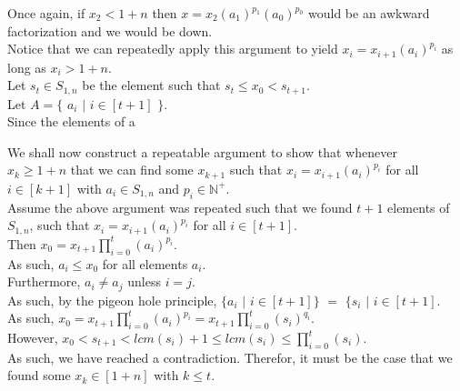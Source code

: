 \documentclass[a4paper,12pt]{article}
\begin{document}
\noindent Once again, if $x_2 < 1 + n$ then $x = x_2(a_1)^{p_1}(a_0)^{p_0}$ would be an awkward factorization and we would be down.\\

\noindent Notice that we can repeatedly apply this argument to yield $x_i = x_{i + 1}(a_i)^{p_i}$ as long as $x_i > 1 + n$.\\

\noindent Let $s_t \in S_{1, n}$ be the element such that $s_t \leq x_0 < s_{t + 1}$.\\

\noindent Let $A = \{$ $a_i$ $|$ $i \in [t + 1]$ $\}$.\\

\noindent Since the elements of a



\noindent We shall now construct a repeatable argument to show that whenever\\ $x_k \geq 1 + n$ that we can find some $x_{k + 1}$ such that $x_i = x_{i + 1}(a_i)^{p_i}$ for all $i \in [k + 1]$ with $a_i \in S_{1, n}$ and $p_i \in \mathbb{N}^+$.\\



\noindent Assume the above argument was repeated such that we found $t + 1$ elements of $S_{1, n}$, such that $x_i = x_{i+1}(a_i)^{p_i}$ for all $i \in [t + 1]$.\\

\noindent Then $\displaystyle x_0 = x_{t + 1} \prod_{i = 0}^t (a_i)^{p_i}$.\\

\noindent As such, $a_i \leq x_0$ for all elements $a_i$.\\

\noindent Furthermore, $a_i \neq a_j$ unless $i = j$.\\

\noindent As such, by the pigeon hole principle, $\{ a_i$ $|$ $i \in [t + 1] \}$ $=$ $\{ s_i$ $|$ $i \in [t + 1]$.\\

\noindent As such, $\displaystyle x_0 = x_{t + 1} \prod_{i = 0}^t (a_i)^{p_i} = x_{t + 1} \prod_{i = 0}^t (s_i)^{q_i}$.\\

\noindent However, $\displaystyle x_0 < s_{t + 1} < lcm(s_i) + 1 \leq lcm(s_i) \leq \prod_{i = 0}^t (s_i)$.\\

\noindent As such, we have reached a contradiction. Therefor, it must be the case that we found some $x_k \in [1 + n]$ with $k \leq t$.\\
\end{document}
